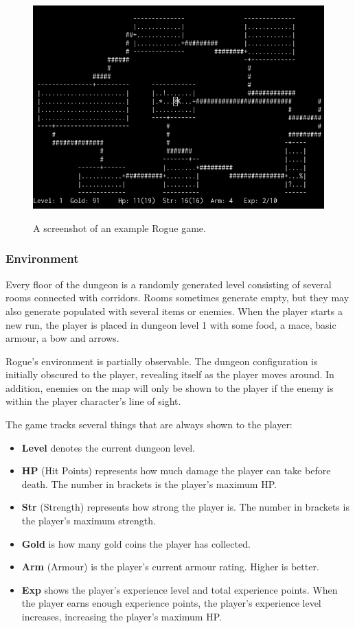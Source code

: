 \documentclass[11pt,a4paper]{article}
\begin{document}
    \begin{figure}[t]
        \caption{A screenshot of an example Rogue game.}
        \centering
        \includegraphics[scale=0.5]{rogue_screenshot}
        \label{rogsc}
    \end{figure}
    \subsubsection{Environment}
    Every floor of the dungeon is a randomly generated level consisting of several rooms connected with corridors. Rooms sometimes generate empty, but they may also generate populated with several items or enemies. When the player starts a new run, the player is placed in dungeon level 1 with some food, a mace, basic armour, a bow and arrows. 

    Rogue's environment is partially observable. The dungeon configuration is initially obscured to the player, revealing itself as the player moves around. In addition, enemies on the map will only be shown to the player if the enemy is within the player character's line of sight.

    The game tracks several things that are always shown to the player:
    \begin{itemize}
        \item \textbf{Level} denotes the current dungeon level.
        \item \textbf{HP} (Hit Points) represents how much damage the player can take before death. The number in brackets is the player's maximum HP.
        \item \textbf{Str} (Strength) represents how strong the player is. The number in brackets is the player's maximum strength.
        \item \textbf{Gold} is how many gold coins the player has collected.
        \item \textbf{Arm} (Armour) is the player's current armour rating. Higher is better.
        \item \textbf{Exp} shows the player's experience level and total experience points. When the player earns enough experience points, the player's experience level increases, increasing the player's maximum HP.
    \end{itemize}
\end{document}
